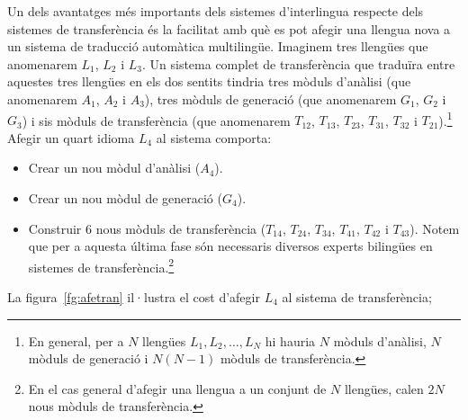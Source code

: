 Un dels avantatges més importants dels sistemes d'interlingua respecte
dels sistemes de transferència és la facilitat amb què es pot afegir
una llengua nova a un sistema de traducció automàtica multilingüe.
Imaginem tres llengües que anomenarem $L_1$, $L_2$ i $L_3$. Un sistema
complet de transferència que traduïra entre aquestes tres llengües en
els dos sentits tindria tres mòduls d'anàlisi (que anomenarem $A_1$,
$A_2$ i $A_3$), tres mòduls de generació (que anomenarem $G_1$, $G_2$
i $G_3$) i sis mòduls de transferència (que anomenarem $T_{12}$,
$T_{13}$, $T_{23}$, $T_{31}$, $T_{32}$ i $T_{21}$).\footnote{En
  general, per a $N$ llengües $L_1, L_2, \ldots, L_N$ hi hauria $N$
  mòduls d'anàlisi, $N$ mòduls de generació i $N(N-1)$ mòduls de
  transferència.} Afegir un quart idioma $L_4$ al sistema comporta:
\begin{itemize}
\item Crear un nou mòdul d'anàlisi ($A_4$).
\item Crear un nou mòdul de generació ($G_4$).
\item Construir 6 nous mòduls de transferència ($T_{14}$, $T_{24}$,
$T_{34}$, $T_{41}$, $T_{42}$ i $T_{43}$). Notem que per a aquesta última
fase són necessaris diversos experts bilingües en sistemes de
transferència.\footnote{En el cas general d'afegir una llengua
a un conjunt de $N$ llengües, calen $2N$ nous mòduls de transferència.}
\end{itemize}
La figura~\ref{fg:afetran}
il·lustra el cost d'afegir $L_4$ al sistema de transferència;
